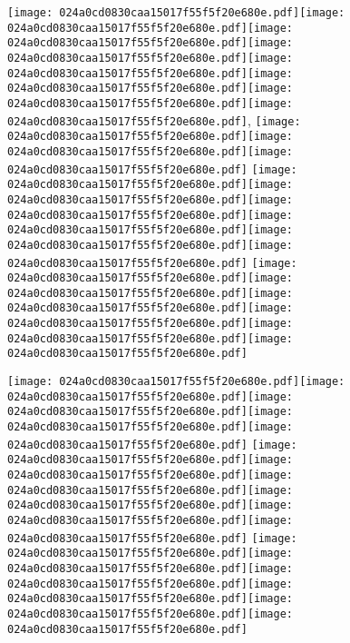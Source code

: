 \documentclass{article}
\newcommand{\origpg}[2]{\texttt{[image: 024a0cd0830caa15017f55f5f20e680e.pdf]}}
\begin{document}
{\vspace{0.385pt}\origpg4{85.303pt 269.64pt 93.938pt 285.78pt}\origpg4{93.938pt 269.64pt 102.01pt 285.78pt}\origpg4{101.93pt 269.64pt 109.77pt 285.78pt}\hspace{-0.129pt}\origpg4{109.64pt 269.64pt 116.81pt 285.78pt}\origpg4{116.86pt 269.64pt 123.23pt 285.78pt}\hspace{-0.355pt}\origpg4{122.88pt 269.64pt 130.04pt 285.78pt}\hspace{0.291pt}\origpg4{130.33pt 269.64pt 138.39pt 285.78pt}\origpg4{138.29pt 269.64pt 146.93pt 285.78pt}, \origpg4{163.81pt 269.64pt 171.93pt 285.78pt}\origpg4{171.98pt 269.64pt 179.03pt 285.78pt}\hspace{-0.307pt}\origpg4{178.72pt 269.64pt 186.79pt 285.78pt} \origpg4{199.43pt 269.64pt 207.65pt 285.78pt}\origpg4{207.65pt 269.64pt 214.81pt 285.78pt}\origpg4{214.81pt 269.64pt 223.45pt 285.78pt}\hspace{-0.161pt}\origpg4{223.29pt 269.64pt 231.92pt 285.78pt}\origpg4{231.92pt 269.64pt 239.09pt 285.78pt}\origpg4{239.17pt 269.64pt 246.59pt 285.78pt} \origpg4{259.39pt 269.64pt 269.61pt 285.78pt}\origpg4{269.51pt 269.64pt 277.58pt 285.78pt}\hspace{-0.597pt}\origpg4{276.98pt 269.64pt 285.2pt 285.78pt}\origpg4{285.2pt 269.64pt 292.37pt 285.78pt}\hspace{-0.21pt}\origpg4{292.16pt 269.64pt 300.21pt 285.78pt}\origpg4{300.11pt 269.64pt 307.47pt 285.78pt} 

\vspace{19.995pt}\origpg4{85.303pt 249.64pt 95.52pt 265.78pt}\origpg4{95.423pt 249.64pt 103.49pt 265.78pt}\hspace{-0.597pt}\origpg4{102.9pt 249.64pt 114.05pt 265.78pt}\origpg4{113.98pt 249.64pt 121.15pt 265.78pt}\hspace{-0.178pt}\origpg4{120.97pt 249.64pt 128.03pt 265.78pt} \hspace{35.961pt}\origpg4{167.96pt 249.64pt 175.58pt 265.78pt}\origpg4{175.66pt 249.64pt 184.29pt 265.78pt}\origpg4{184.29pt 249.64pt 192.36pt 265.78pt}\hspace{-0.323pt}\origpg4{192.04pt 249.64pt 200.09pt 265.78pt}\origpg4{200pt 249.64pt 208.63pt 265.78pt}\origpg4{208.63pt 249.64pt 215.8pt 265.78pt} \hspace{35.961pt}\origpg4{255.65pt 249.64pt 263.72pt 265.78pt}\hspace{-0.839pt}\origpg4{262.88pt 249.64pt 270.95pt 265.78pt}\hspace{-0.113pt}\origpg4{270.84pt 249.64pt 278.91pt 265.78pt}\origpg4{279pt 249.64pt 287.07pt 265.78pt}\hspace{-0.113pt}\origpg4{286.96pt 249.64pt 299.39pt 265.78pt}\origpg4{299.47pt 249.64pt 307.54pt 265.78pt} 

}
\end{document}
